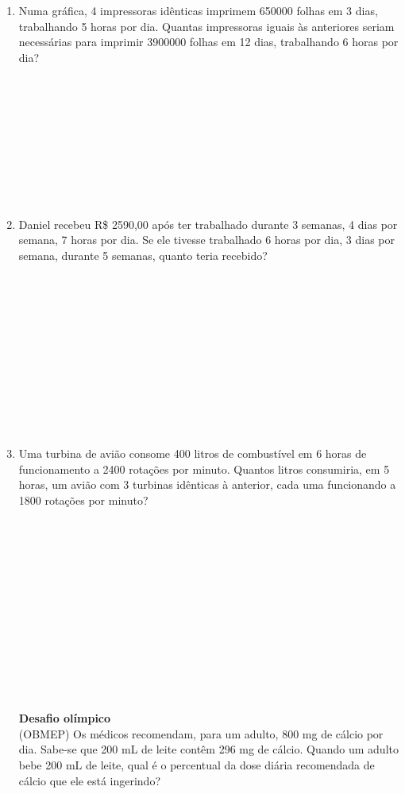 \documentclass[a4paper,14pt]{article}
\begin{document}
\begin{multicols}{2}
\begin{enumerate}
			\item Numa gráfica, 4 impressoras idênticas imprimem 650000 folhas em 3 dias, trabalhando 5 horas por dia. Quantas impressoras iguais às anteriores seriam necessárias para imprimir 3900000 folhas em 12 dias, trabalhando 6 horas por dia? \\\\\\\\\\\\\\\\\\\\
			\item Daniel recebeu R\$ 2590,00 após ter trabalhado durante 3 semanas, 4 dias por semana, 7 horas por dia. Se ele tivesse trabalhado 6 horas por dia, 3 dias por semana, durante 5 semanas, quanto teria recebido? \\\\\\\\\\\\\\\\\\\\\\\\
			\item Uma turbina de avião consome 400 litros de combustível em 6 horas de funcionamento a 2400 rotações por minuto. Quantos litros consumiria, em 5 horas, um avião com 3 turbinas idênticas à anterior, cada uma funcionando a 1800 rotações por minuto? \\\\\\\\\\\\\\\\\\\\\\\\\\\\
			\textbf{Desafio olímpico}\\
			(OBMEP) Os médicos recomendam, para um adulto, 800 mg de cálcio por dia. Sabe-se que 200 mL de leite contêm 296 mg de cálcio. Quando um adulto bebe 200 mL de leite, qual é o percentual da dose diária recomendada de cálcio que ele está ingerindo?\\\\

\end{enumerate}
\end{multicols}
\end{document}

